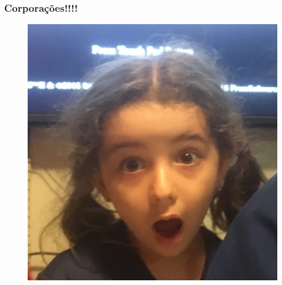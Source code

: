 \documentclass[xcolor=dvipsnames]{beamer}
\begin{document}
\begin{frame}
\frametitle{Corporações!!!!}
\begin{figure}
\begin{center}
 	\includegraphics[scale=0.21]{elisa_chocada.JPG}
	\end{center}
	\end{figure}
\end{frame}
\end{document}
